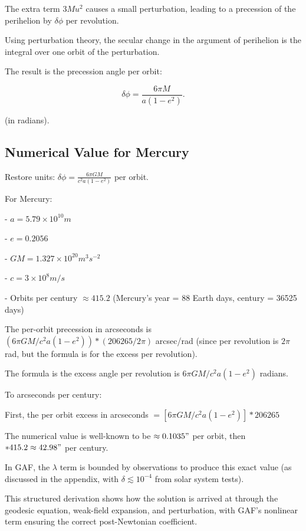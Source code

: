 \documentclass{article}
\begin{document}
The extra term \(3 M u^2\) causes a small perturbation, leading to a precession of the perihelion by \(\delta \phi\) per revolution.

Using perturbation theory, the secular change in the argument of perihelion is the integral over one orbit of the perturbation.

The result is the precession angle per orbit:

\begin{equation}
 \delta \phi = \frac{6 \pi M}{a (1 - e^2)}.
\end{equation}

(in radians).

\subsection{Numerical Value for Mercury}

Restore units: \(\delta \phi = \frac{6 \pi GM}{c^2 a (1 - e^2)}\) per orbit.

For Mercury:

- \(a = 5.79 \times 10^{10} m\)

- \(e = 0.2056\)

- \(GM = 1.327 \times 10^{20} m^3 s^{-2}\)

- \(c = 3 \times 10^8 m/s\)

- Orbits per century \(\approx 415.2\) (Mercury's year = 88 Earth days, century = 36525 days)

The per-orbit precession in arcseconds is \((6 \pi GM / c^2 a (1 - e^2)) * (206265 / 2\pi)\) arcsec/rad (since per revolution is \(2\pi\) rad, but the formula is for the excess per revolution).

The formula is the excess angle per revolution is \(6 \pi GM / c^2 a (1 - e^2)\) radians.

To arcseconds per century:

First, the per orbit excess in arcseconds \(= [6 \pi GM / c^2 a (1 - e^2)] * 206265\)

The numerical value is well-known to be \(\approx 0.1035 "\) per orbit, then \(* 415.2 \approx 42.98 "\) per century.

In GAF, the \(\lambda\) term is bounded by observations to produce this exact value (as discussed in the appendix, with \(\delta \lesssim 10^{-4}\) from solar system tests).

This structured derivation shows how the solution is arrived at through the geodesic equation, weak-field expansion, and perturbation, with GAF's nonlinear term ensuring the correct post-Newtonian coefficient.
\end{document}
